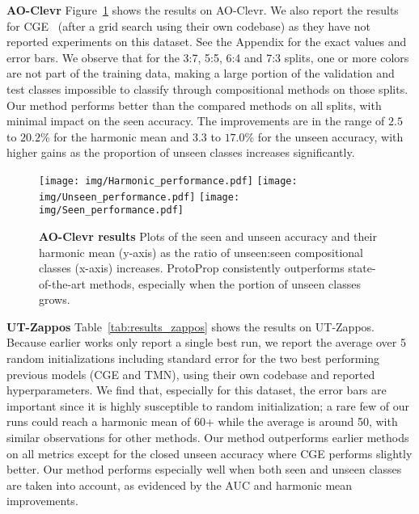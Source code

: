 \documentclass{article}
\begin{document}
\textbf{AO-Clevr} Figure~\ref{fig:results_clevr} shows the results on AO-Clevr. We also report the results for CGE~\citep{naeem2021learning} (after a grid search using their own codebase) as they have not reported experiments on this dataset. See the Appendix for the exact values and error bars. We observe that for the 3:7, 5:5, 6:4 and 7:3 splits, one or more colors are not part of the training data, making a large portion of the validation and test classes impossible to classify through compositional methods on those splits. Our method performs better than the compared methods on all splits, with minimal impact on the seen accuracy. The improvements are in the range of $2.5$ to $20.2$\% for the harmonic mean and $3.3$ to $17.0$\% for the unseen accuracy, with higher gains as the proportion of unseen classes increases significantly.

\begin{figure}[htb]
    \centering
    \texttt{[image: img/Harmonic\_performance.pdf]}
    \texttt{[image: img/Unseen\_performance.pdf]}
    \texttt{[image: img/Seen\_performance.pdf]}
    
    \caption{\textbf{AO-Clevr results} Plots of the seen and unseen accuracy and their harmonic mean (y-axis) as the ratio of unseen:seen compositional classes (x-axis) increases. ProtoProp consistently outperforms state-of-the-art methods, especially when the portion of unseen classes grows.}
    \label{fig:results_clevr}
\end{figure}

\textbf{UT-Zappos} Table~\ref{tab:results_zappos} shows the results on UT-Zappos. Because earlier works only report a single best run, we report the average over 5 random initializations including standard error for the two best performing previous models (CGE and TMN), using their own codebase and reported hyperparameters. We find that, especially for this dataset, the error bars are important since it is highly susceptible to random initialization; a rare few of our runs could reach a harmonic mean of 60+ while the average is around 50, with similar observations for other methods. Our method outperforms earlier methods on all metrics except for the closed unseen accuracy where CGE performs slightly better. Our method performs especially well when both seen and unseen classes are taken into account, as evidenced by the AUC and harmonic mean improvements.
\end{document}
